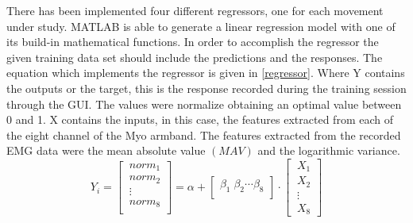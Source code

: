 There has been implemented four different regressors, one for each movement under study. MATLAB is able to generate a linear regression model with one of its build-in mathematical functions. In order to accomplish the regressor the given training data set should include the predictions and the responses.
The equation which implements the regressor is given in \ref{regressor}. Where Y contains the outputs or the target, this is the response recorded during the training session through the GUI. The values were normalize obtaining an optimal value between 0 and 1. X contains the inputs, in this case, the features extracted from each of the eight channel of the Myo armband. The features extracted from the recorded EMG data were the mean absolute value $\left( MAV\right)$ and  the logarithmic variance. %
\begin{equation}
	Y_i=\begin{bmatrix} 
	\ norm_1 \\ 
	\ norm_2\\ 
	\ \vdots\\
	\ norm_8\\
	\end{bmatrix}=
	\alpha +
	\begin{bmatrix} 
	\beta_1 \; \beta_2 \cdots \beta_8\\ 
	\end{bmatrix}
	\cdot 
		\begin{bmatrix} 
	\ X_1 \\ 
	\ X_2\\ 
	\ \vdots\\
	\ X_8
	\label{regressor}
	\end{bmatrix}
\end{equation}


